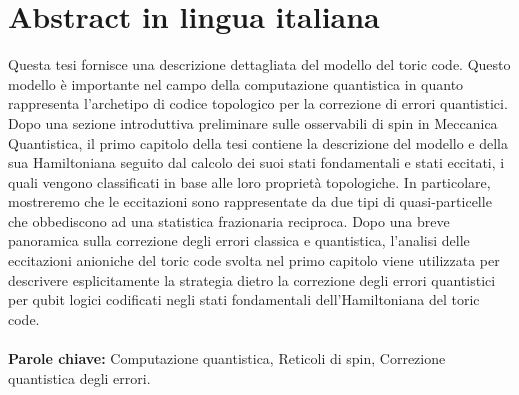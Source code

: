 \documentclass{Configuration_Files/PoliMi3i_thesis}
\begin{document}
\chapter*{Abstract in lingua italiana}
Questa tesi fornisce una descrizione dettagliata del modello del toric code. Questo modello è importante nel campo della computazione quantistica in quanto rappresenta l'archetipo di codice topologico per la correzione di errori quantistici. Dopo una sezione introduttiva preliminare sulle osservabili di spin in Meccanica Quantistica, il primo capitolo della tesi contiene la descrizione del modello e della sua Hamiltoniana seguito dal calcolo dei suoi stati fondamentali e stati eccitati, i quali vengono classificati in base alle loro proprietà topologiche. In particolare, mostreremo che le eccitazioni sono rappresentate da due tipi di quasi-particelle che obbediscono ad una statistica frazionaria reciproca. Dopo una breve panoramica sulla correzione degli errori classica e quantistica, l'analisi delle eccitazioni anioniche del toric code svolta nel primo capitolo viene utilizzata per descrivere esplicitamente la strategia dietro la correzione degli errori quantistici per qubit logici codificati negli stati fondamentali dell'Hamiltoniana del toric code. 
\\
\\
\textbf{Parole chiave:} Computazione quantistica, Reticoli di spin, Correzione quantistica degli errori. %


\thispagestyle{empty}
\tableofcontents %
\thispagestyle{empty}
\cleardoublepage

%
%
%    
%
\end{document}
